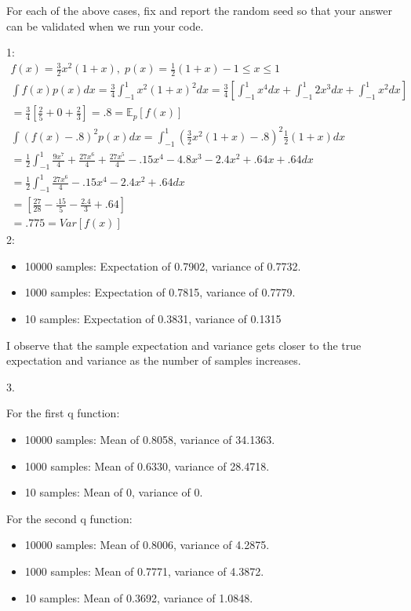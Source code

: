 \documentclass[12pt]{article}
\begin{document}
For each of the above cases, fix and report the random seed so that your answer can be validated when we run your code.
\begin{solution}
1: \begin{align*}
f(x) = \frac{3}{2}x^{2}(1+x), \;
p(x) = \frac{1}{2}(1+x) -1\leq x \leq 1 \\
\int f(x)p(x) dx = \frac{3}{4} \int_{-1}^{1} x^{2}(1+x)^{2}dx = \frac{3}{4}\left[\int_{-1}^{1} x^{4} dx + \int_{-1}^{1} 2x^{3} dx + \int_{-1}^{1} x^{2} dx \right] \\
= \frac{3}{4}\left[ \frac{2}{5} + 0+\frac{2}{3}\right] = .8 = \mathbb{E}_p[f(x)]\\
\int (f(x)-.8)^{2}p(x) dx = \int_{-1}^{1} (\frac{3}{2}x^{2}(1+x) -.8)^2\frac{1}{2}(1+x) dx \\
= \frac{1}{2} \int_{-1}^{1} \frac{9x^{7}}{4} + \frac{27x^{6}}{4} +\frac{27x^{5}}{4} -.15x^{4} - 4.8x^{3} - 2.4x^{2} + .64x + .64 dx \\ 
= \frac{1}{2} \int_{-1}^{1} \frac{27x^{6}}{4}  -.15x^{4} - 2.4x^{2} + .64 dx \\
= \left[\frac{27}{28} - \frac{.15}{5} - \frac{2.4}{3} + .64 \right] \\ 
= .775 = Var[f(x)]
\end{align*}
2:
\begin{itemize}
    \item 10000 samples: Expectation of 0.7902, variance of 0.7732.
    \item 1000 samples: Expectation of 0.7815, variance of 0.7779.
    \item 10 samples: Expectation of 0.3831, variance of 0.1315
\end{itemize}
I observe that the sample expectation and variance gets closer to the true expectation and variance as the number of samples increases.

3.

For the first q function:
\begin{itemize}
    \item 10000 samples: Mean of 0.8058, variance of 34.1363.
    \item 1000 samples: Mean of 0.6330, variance of 28.4718.
    \item 10 samples: Mean of 0, variance of 0.
\end{itemize}

For the second q function:
\begin{itemize}
    \item 10000 samples: Mean of 0.8006, variance of 4.2875.
    \item 1000 samples: Mean of 0.7771, variance of 4.3872.
    \item 10 samples: Mean of 0.3692, variance of 1.0848.
\end{itemize}


\end{solution}
\end{document}
